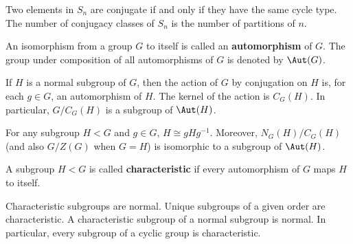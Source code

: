 \begin{proposition}
	\cite[126]{DummitFoote2004}
	Two elements in $S_n$ are conjugate if and only if they have the same cycle type.
	The number of conjugacy classes of $S_n$ is the number of partitions of $n$.
\end{proposition}

\begin{definition}
	\cite[133]{DummitFoote2004}
	An isomorphism from a group $G$ to itself is called an \textbf{automorphism} of $G$.
	The group under composition of all automorphisms of $G$ is denoted by $\Aut(G)$.
\end{definition}

\begin{proposition}
	\cite[133]{DummitFoote2004}
	If $H$ is a normal subgroup of $G$, then the action of $G$
	by conjugation on $H$ is, for each $g \in G$, an automorphism of $H$. The kernel of the
	action is $C_G(H)$. In particular, $G / C_G(H)$ is a subgroup of $\Aut(H)$.
\end{proposition}

\begin{corollary}
	\cite[134]{DummitFoote2004}
	For any subgroup $H < G$ and $g \in G$, $H \cong gHg^{-1}$. Moreover, $N_G(H) / C_G(H)$
	(and also $G/Z(G)$ when $G = H$) is isomorphic to a subgroup of $\Aut(H)$.
\end{corollary}

\begin{definition}
	\cite[135]{DummitFoote2004}
	A subgroup $H < G$ is called \textbf{characteristic} if every automorphism of $G$ maps
	$H$ to itself.
\end{definition}

\begin{proposition}
	\cite[135]{DummitFoote2004}
	Characteristic subgroups are normal. Unique subgroups of a given order are
	characteristic. A characteristic subgroup of a normal subgroup is normal. In particular,
	every subgroup of a cyclic group is characteristic.
\end{proposition}


